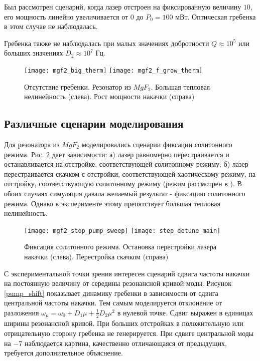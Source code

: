 Был рассмотрен сценарий, когда лазер отстроен на фиксированную величину $10$, его мощность линейно увеличивается от 0 до $P_0=100$ мВт. Оптическая гребенка в этом случае не наблюдалась.

Гребенка также не наблюдалась при малых значениях добротности $Q\approx10^5$ или больших значениях $D_2\approx10^7$ Гц.

\begin{figure}
  \texttt{[image: mgf2\_big\_therm]}
  \texttt{[image: mgf2\_f\_grow\_therm]}
  \caption{Отсутствие гребенки. Резонатор из $MgF_2$. Большая тепловая нелинейность (слева). Рост мощности накачки (справа)} \label{no_comb}
\end{figure}

\subsection{Различные сценарии моделирования}

Для резонатора из $MgF_2$ моделировались сценарии фиксации солитонного режима. Рис. \ref{step_detune} дает зависимости: а) лазер равномерно перестраивается и останавливается на отстройке, соответствующей солитонному режиму; б) лазер перестраивается скачком с отстройки, соответствующей хаотическому режиму, на отстройку, соответствующую солитонному режиму (режим рассмотрен в \cite{Matsko2013}). В обоих случаях симуляция давала желаемый результат - фиксацию солитонного режима. Однако в эксперименте этому препятствует большая тепловая нелинейность.

\begin{figure}
  \texttt{[image: mgf2\_stop\_pump\_sweep]}
  \texttt{[image: step\_detune\_main]}
  \caption{Фиксация солитонного режима. Остановка перестройки лазера накачки (слева). Перестройка скачком (справа)} \label{step_detune}
\end{figure}

С экспериментальной точки зрения интересен сценарий сдвига частоты накачки на постоянную величину от середины резонансной кривой моды. Рисунок \ref{pump_shift} показывает динамику гребенки в зависимости от сдвига центральной частоты накачки. Тем самым моделируется отклонение от разложения $\omega_\mu=\omega_0+D_1\mu+\frac{1}{2}D_2\mu^2$ в нулевой точке. Сдвиг выражен в единицах ширины резонансной кривой. При больших отстройках в положительную или отрицательную сторону гребенка не генерируется. При сдвиге центральной моды на $-7$ наблюдается картина, качественно отличающаяся от предыдущих, требуется дополнительное объяснение.


